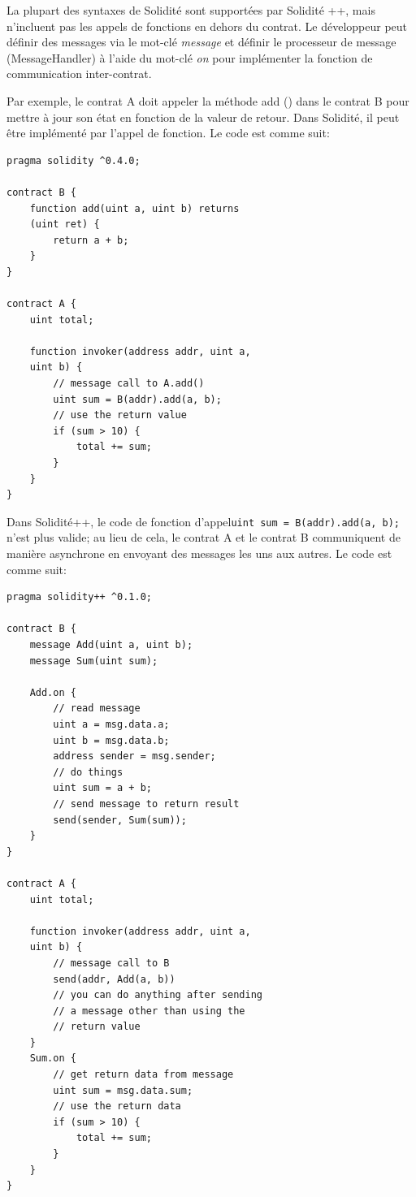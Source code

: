 \documentclass[UTF8,nofonts]{article}
\begin{document}
\begin{multicols}{2}
La plupart des syntaxes de Solidité sont supportées par Solidité ++, mais n'incluent pas les appels de fonctions en dehors du contrat. Le développeur peut définir des messages via le mot-clé \emph{message} et définir le processeur de message (MessageHandler) à l'aide du mot-clé \emph{on} pour implémenter la fonction de communication inter-contrat.

Par exemple, le contrat A doit appeler la méthode add () dans le contrat B pour mettre à jour son état en fonction de la valeur de retour. Dans Solidité, il peut être implémenté par l'appel de fonction. Le code est comme suit:
\begin{verbatim}
pragma solidity ^0.4.0;

contract B {
    function add(uint a, uint b) returns
    (uint ret) { 
        return a + b;
    }
}

contract A {
    uint total;    
   
    function invoker(address addr, uint a,
    uint b) {
        // message call to A.add()
        uint sum = B(addr).add(a, b);
        // use the return value
        if (sum > 10) {
            total += sum;
        }
    }
}
\end{verbatim}

Dans Solidité++, le code de fonction d'appel\texttt{uint sum = B(addr).add(a, b);} n'est plus valide; au lieu de cela, le contrat A et le contrat B communiquent de manière asynchrone en envoyant des messages les uns aux autres. Le code est comme suit:

\begin{verbatim}
pragma solidity++ ^0.1.0;

contract B {
    message Add(uint a, uint b);
    message Sum(uint sum);
    
    Add.on {
        // read message
        uint a = msg.data.a;
        uint b = msg.data.b;
        address sender = msg.sender;
        // do things 
        uint sum = a + b;
        // send message to return result
        send(sender, Sum(sum));
    }
}

contract A {
    uint total;    
   
    function invoker(address addr, uint a,
    uint b) {
        // message call to B
        send(addr, Add(a, b))        
        // you can do anything after sending
        // a message other than using the 
        // return value
    }
    Sum.on {
        // get return data from message
        uint sum = msg.data.sum;
        // use the return data
        if (sum > 10) {
            total += sum;
        }
    }
}
\end{verbatim}


\end{multicols}
\end{document}
